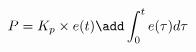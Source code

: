 \documentclass[preview]{standalone}
\begin{document}
\begin{align*}
P = K_p \times e(t) \add \int_{0}^{t} e(\tau) d\tau
\end{align*}
\end{document}
